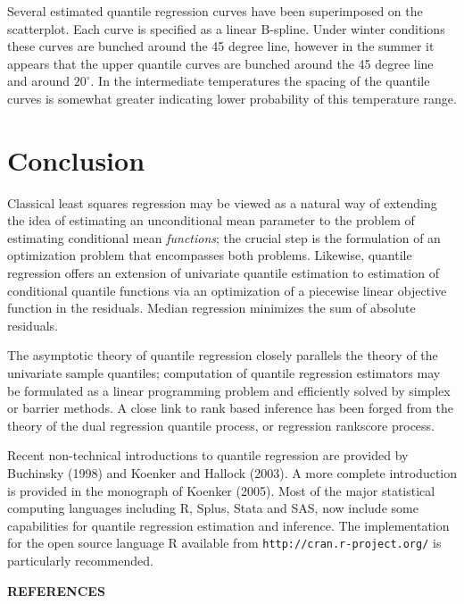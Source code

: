 \documentclass{amsart}
\newenvironment{apabib}{
  \noindent
\begin{center}
{\bf{ R}EFERENCES}
\end{center}
\vspace{-3mm}
\begin{list}{}{
  \topsep          0mm
  \leftmargin     10mm
  \parsep          0mm
  \listparindent -10mm}
  \item[]\strut\par}{
\end{list}}
\begin{document}
  
Several estimated quantile regression curves have been superimposed
on the scatterplot.  Each curve is specified as a linear B-spline. 
Under winter conditions these curves are bunched around the 45 degree
line, however in the summer it appears that the upper quantile curves
are bunched around the 45 degree line and around $20^\circ$.  In the
intermediate temperatures the spacing of the quantile curves is somewhat
greater indicating lower probability of this temperature range.



\section{Conclusion}

Classical least squares regression may be viewed as a
natural way of extending the idea of estimating an unconditional
mean parameter to the problem of estimating conditional mean {\it functions};
the crucial step is the formulation of an optimization problem
that encompasses both problems.  Likewise, quantile regression
offers an extension of univariate quantile estimation to estimation
of conditional quantile functions via an optimization of
a piecewise linear objective function in the residuals.  Median
regression minimizes the sum of absolute residuals.

The asymptotic theory of quantile regression closely parallels the
theory of the univariate sample quantiles; computation
of quantile regression estimators may be formulated as a linear
programming problem and efficiently solved by simplex or
barrier methods.  A close link to rank based inference has been
forged from the theory of the dual regression quantile process,
or regression rankscore process.

Recent non-technical introductions to quantile regression are provided
by Buchinsky (1998) and Koenker  and Hallock (2003).  A more complete introduction 
is provided in the monograph of Koenker (2005).
Most of the major statistical computing languages including R, Splus,
Stata and SAS, now include some
capabilities for quantile regression estimation and inference.
The implementation for the open source language R available from
\texttt{http://cran.r-project.org/}  is particularly recommended.

\vspace{15mm}
\begin{apabib}

\end{apabib}
\end{document}
